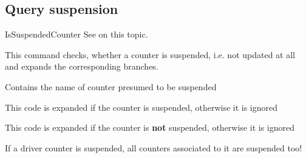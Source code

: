\documentclass[12pt,a4paper,oneside]{article}
\makeatletter
\newcommand{\chdocextractversion}[1]{%
  \@nameuse{#1}%
}
\newcommand{\CHDocNew}[1]{%
  \tcbdocmarginnote[doclang/new={N},
  colframe=blue,
  halign=left,
  colback={blue!20!white},
  fontupper={\tiny}
  ]{%
    \chdocextractversion{xassoccntversion#1}%
  }%
}
\makeatother
\begin{document}
\subsection{Query suspension}
\begin{docCommand}[before={\CHDocNew{0.1}}\par]{IsSuspendedCounter}{}
See  on this topic. 

This command checks, whether a counter is suspended, i.e. not updated at all and expands the corresponding branches.


\begin{codeoptionsenum}
\item {}%

  Contains the name of counter presumed to be suspended

\item {}

  This code is expanded if the counter is suspended, otherwise it is ignored

\item {}

  This code is expanded if the counter is \textbf{not} suspended, otherwise it is ignored

\end{codeoptionsenum}


\end{docCommand}



\begin{marker}
If a driver counter is suspended, all counters associated to it are suspended too!
\end{marker}
\end{document}
